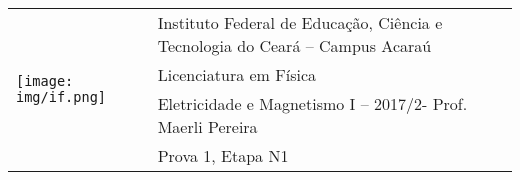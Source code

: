 \documentclass[a4paper,10pt]{article}
\newcommand{\curso}{Licenciatura em Física}
\newcommand{\disciplina}{Eletricidade e Magnetismo I – 2017/2}
\newcommand{\professor}{Prof. Maerli Pereira}
\newcommand{\instituicao}{Instituto Federal de Educação, Ciência e Tecnologia do Ceará – Campus Acaraú}
\newcommand{\etapa}{N1}
\newcommand{\prova}{1}
\begin{document}
\begin{table}
   \hspace{-0.4cm}
   \begin{tabular}{ll}
        \multirow{4}{*}{ \texttt{[image: img/if.png]}} 
        &\instituicao\\
        &\noindent\curso\\
        &\disciplina  - \professor\\
        & Prova \prova, Etapa \etapa \\
    \end{tabular}
\end{table}

\vspace{0.3cm}
\hspace{-0.5cm}
\end{document}
